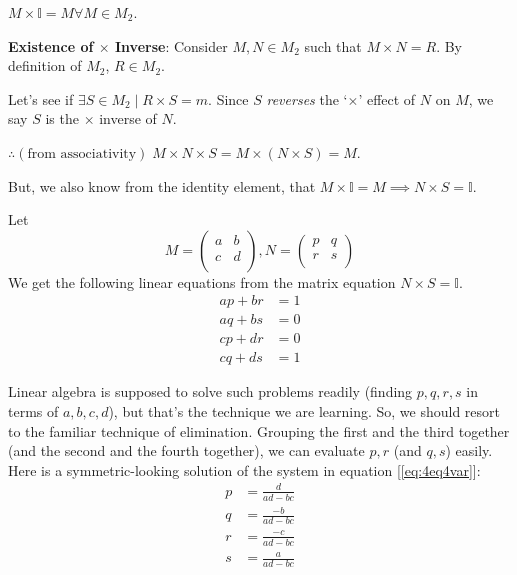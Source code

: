 \documentclass[english,notitlepage,smartquotes]{hgbreport}
\theoremstyle{definition}
\theoremstyle{definition}
\theoremstyle{remark}
\theoremstyle{definition}
\theoremstyle{plain}
\theoremstyle{definition}
\begin{document}
\begin{enumerate}
$M\times\mathbb{I}=M\forall M\in M_2$.

\textbf{Existence of $\times$ Inverse}: Consider $M,N\in M_2$ such that $M\times N=R$. By definition of $M_2$, $R\in M_2$. 

Let's see if $\exists S\in M_2\mid R\times S=m$. Since $S$ \emph{reverses} the `$\times$' effect of $N$ on $M$, we say $S$ is the $\times$ inverse of $N$.

$\therefore (\text{from associativity})\; M\times N\times S=M\times(N\times S)=M$.

But, we also know from the identity element, that $M\times\mathbb{I}=M\implies N\times S=\mathbb{I}$.

Let 
$$
  M=\begin{pmatrix}
    a & b\\
    c & d\\
  \end{pmatrix},
  N=\begin{pmatrix}
    p & q\\
    r & s\\
  \end{pmatrix}
$$
We get the following linear equations from the matrix equation $N\times S=\mathbb{I}$.
\begin{equation}
\begin{aligned}
ap+br &= 1\\
aq+bs &= 0\\
cp+dr &= 0\\
cq+ds &= 1
\end{aligned}\label{eq:4eq4var}
\end{equation}

Linear algebra is supposed to solve such problems readily (finding $p,q,r,s$ in terms of $a,b,c,d$), but that's the technique we are learning. So, we should resort to the familiar technique of elimination. Grouping the first and the third together (and the second and the fourth together), we can evaluate $p,r$ (and $q,s$) easily. Here is a symmetric-looking solution of the system in equation [\ref{eq:4eq4var}]:
\begin{equation}
\begin{aligned}
p &= \frac{d}{ad-bc} \\
q &= \frac{-b}{ad-bc} \\
r &= \frac{-c}{ad-bc} \\
s &= \frac{a}{ad-bc}
\end{aligned}\label{eq:4eq4varsol}
\end{equation}


\end{enumerate}
\end{document}
